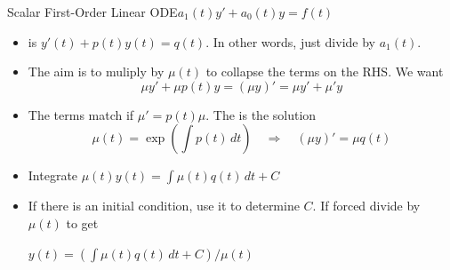 \begin{frame}{Scalar First-Order Linear ODE\quad $a_1(t)y'+a_0(t)y=f(t)$}
\begin{itemize}
  \item {} is $y'(t)+p(t)y(t)=q(t)$. In other words, just divide by $a_1(t)$.
  \item The aim is to muliply by $\mu(t)$ to collapse the terms on the RHS. We want
  \[
    \mu y'+\mu p(t)y=(\mu y)'=\mu y'+\mu' y
  \]

  \item The terms match if $\mu'=p(t)\mu$. The  is the solution 
  \[
    \mu(t)=\exp\left(\int p(t)\,dt\right)
    \quad\Longrightarrow\quad (\mu y)'=\mu q(t)
  \]
  \item Integrate\quad
  $\boxed{\displaystyle\mu(t)y(t)=\int\mu(t)q(t)\,dt+C}$
  \item If there is an initial condition, use it to determine $C$. If forced divide by $\mu(t)$ to get
  \par\centerline{$\boxed{y(t)=\left(\int\mu(t)q(t)\,dt+C\right)/\mu(t)}$}
\end{itemize}
\end{frame}
